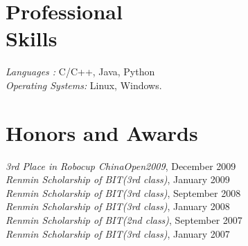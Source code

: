 \documentclass[margin]{res}
\begin{document}
\begin{resume}
 \section{Professional \\ Skills} {\sl Languages :} C/C++, Java, Python \\
                {\sl Operating Systems:} Linux, Windows.
 
\section{Honors and Awards }             
             {\it 3rd Place in Robocup ChinaOpen2009}, 	December	2009 \\             			
			 {\it Renmin Scholarship of BIT(3rd class)}, January	2009 \\            	
			 {\it Renmin Scholarship of BIT(3rd class)}, September	2008 \\            
			 {\it Renmin Scholarship of BIT(3rd class)}, January	2008 \\            
			 {\it Renmin Scholarship of BIT(2nd class)}, September	2007 \\  
			 {\it Renmin Scholarship of BIT(3rd class)}, January	2007 			 			 
\end{resume}
\end{document}
